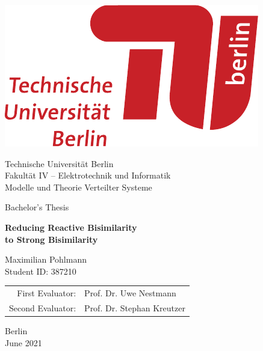 \begin{titlepage}
\begin{center}
    \includegraphics[scale=.2]{TU_Logo}

    \vspace{3.5em}

    {\sc\large 
        {\LARGE Technische Universität Berlin}\\
        {Fakultät IV --  Elektrotechnik und Informatik}\\
        {Modelle und Theorie Verteilter Systeme}

        \vspace{4em}

        {Bachelor's Thesis}

        \vspace{1.5em}

        {\huge\upshape\bf Reducing Reactive Bisimilarity\\[.25em]
        to Strong Bisimilarity}

        \vspace{3em}

        {\Large Maximilian Pohlmann}\\
        {Student ID: 387210}

        \vfill

        {\normalsize
            \begin{tabular}{r l}
                First Evaluator: & Prof. Dr. Uwe Nestmann \\
                Second Evaluator: & Prof. Dr. Stephan Kreutzer
            \end{tabular}
        }

        \vspace{3em}

        Berlin\\
        June 2021
    }
\end{center}
\end{titlepage}